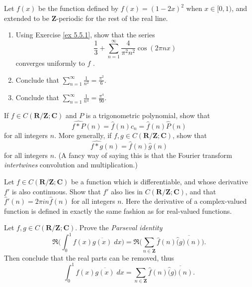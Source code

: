 \begin{exercise}\label{ex 5.5.2}
    Let \(f(x)\) be the function defined by \(f(x) = (1 - 2x)^2\) when \(x \in [0, 1)\), and extended to be \(\mathbf{Z}\)-periodic for the rest of the real line.
    \begin{enumerate}
        \item Using Exercise \ref{ex 5.5.1}, show that the series
              \[
                  \frac{1}{3} + \sum_{n = 1}^\infty \frac{4}{\pi^2 n^2} \cos(2 \pi n x)
              \]
              converges uniformly to \(f\) .
        \item Conclude that \(\sum_{n = 1}^\infty \frac{1}{n^2} = \frac{\pi^2}{6}\).
        \item Conclude that \(\sum_{n = 1}^\infty \frac{1}{n^4} = \frac{\pi^4}{90}\).
    \end{enumerate}
\end{exercise}

\begin{exercise}\label{ex 5.5.3}
    If \(f \in C(\mathbf{R} / \mathbf{Z} ; \mathbf{C})\) and \(P\) is a trigonometric polynomial, show that
    \[
        \hat{f * P}(n) = \hat{f}(n) c_n = \hat{f}(n) \hat{P}(n)
    \]
    for all integers \(n\).
    More generally, if \(f, g \in C(\mathbf{R} / \mathbf{Z} ; \mathbf{C})\), show that
    \[
        \hat{f * g}(n) = \hat{f}(n) \hat{g}(n)
    \]
    for all integers \(n\).
    (A fancy way of saying this is that the Fourier transform \emph{intertwines} convolution and multiplication.)
\end{exercise}

\begin{exercise}\label{ex 5.5.4}
    Let \(f \in C(\mathbf{R} / \mathbf{Z} ; \mathbf{C})\) be a function which is differentiable, and whose derivative \(f'\) is also continuous.
    Show that \(f'\) also lies in \(C(\mathbf{R} / \mathbf{Z} ; \mathbf{C})\), and that \(\hat{f}'(n) = 2 \pi i n \hat{f}(n)\) for all integers \(n\).
    Here the derivative of a complex-valued function is defined in exactly the same fashion as for real-valued functions.
\end{exercise}

\begin{exercise}\label{ex 5.5.5}
    Let \(f, g \in C(\mathbf{R} / \mathbf{Z} ; \mathbf{C})\).
    Prove the \emph{Parseval identity}
    \[
        \Re\bigg(\int_0^1 f(x) \overline{g(x)} \; dx\bigg) = \Re\bigg(\sum_{n \in \mathbf{Z}} \hat{f}(n) \overline{\hat(g)(n)}\bigg).
    \]
    Then conclude that the real parts can be removed, thus
    \[
        \int_0^1 f(x) \overline{g(x)} \; dx = \sum_{n \in \mathbf{Z}} \hat{f}(n) \overline{\hat(g)(n)}.
    \]
\end{exercise}

